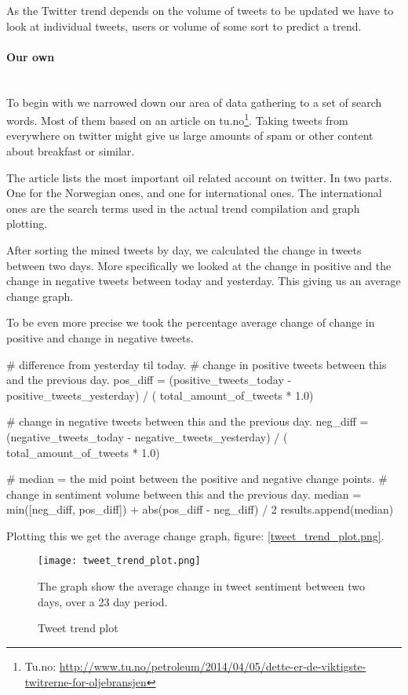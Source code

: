 As the Twitter trend depends on the volume of tweets to be updated we have to
look at individual tweets, users or volume of some sort to predict a trend. 
%

\paragraph{Our own}
\hspace{0pt}\\
To begin with we narrowed down our area of data gathering to a set of search
words. Most of them based on an article on tu.no\footnote{Tu.no:
\url{http://www.tu.no/petroleum/2014/04/05/dette-er-de-viktigste-twitrerne-for-oljebransjen}}.
Taking tweets from everywhere on twitter might give us large amounts of spam or
other content about breakfast or similar. 

The article lists the most important oil related account on twitter. In two
parts. One for the Norwegian ones, and one for international ones. The
international ones are the search terms used in the actual trend compilation
and graph plotting. 

After sorting the mined tweets by day, we calculated the change in tweets
between two days. More specifically we looked at the change in positive and the
change in negative tweets between today and yesterday. This giving us an
average change graph.

To be even more precise we took the percentage average change of change in
positive and change in negative tweets. 
\begin{python}
# difference from yesterday til today.
# change in positive tweets between this and the previous day.
pos_diff = (positive_tweets_today - positive_tweets_yesterday) / (
    total_amount_of_tweets * 1.0)

# change in negative tweets between this and the previous day.
neg_diff = (negative_tweets_today - negative_tweets_yesterday) / (
    total_amount_of_tweets * 1.0)

# median = the mid point between the positive and negative change points.
# change in sentiment volume between this and the previous day.
median = min([neg_diff, pos_diff]) + abs(pos_diff - neg_diff) / 2
results.append(median)
\end{python}
Plotting this we get the average change graph, figure: \ref{tweet_trend_plot.png}.

\begin{figure}[htb]
    \centering
    \texttt{[image: tweet\_trend\_plot.png]}
    \label{fig:trend_tweet_plot}
    \caption{Tweet trend plot}
The graph show the average change in tweet sentiment between two days, over a 23 day period. 
\end{figure}
% 

